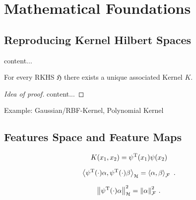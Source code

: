 \section{Mathematical Foundations}

\subsection{Reproducing Kernel Hilbert Spaces}
\begin{definition}[RKHS]
	\label{def:rkhs}
	content...
\end{definition}

\begin{definition}[Kernel]
	\label{def:kernel}
\end{definition}

\begin{theorem}
	\label{theo:kernel-for-rkhs}
	For every RKHS $\mathfrak{H}$ there exists a unique associated Kernel $K$.
\end{theorem}
\begin{proof}[Idea of proof]
	content...
\end{proof}

Example: Gaussian/RBF-Kernel, Polynomial Kernel

\subsection{Features Space and Feature Maps}


\begin{equation}
	\label{eq:kernel-feature-map}
	K(x_1, x_2) = \psi^{\mathrm{T}}(x_1)\psi(x_2)
\end{equation}

\begin{theorem}
	\begin{equation}
		\left< \psi^{\mathrm{T}}(\cdot) \alpha, \psi^{\mathrm{T}}(\cdot) \beta\right>_\mathcal{H} = \left< \alpha, \beta\right>_\mathcal{F} \ .
	\end{equation}
\end{theorem}
\begin{corollary}
	\label{cor:feature-space-norm}
	\begin{equation}
		\norm{\psi^{\mathrm{T}}(\cdot)\alpha}_\mathcal{H}^2 = \norm{\alpha}_\mathcal{F}^2 \ .
	\end{equation}
\end{corollary}

